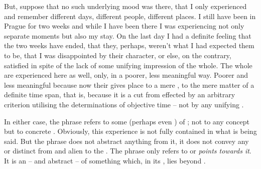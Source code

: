 But, suppose that no such underlying mood was there, that I only experienced and
remember different days, different people, different places. I still have been in
Prague for two weeks and while I have been there I was experiencing not only separate
moments but also my stay. On the last day I had a definite feeling that the two
weeks have ended, that they, perhaps, weren't what I had expected them to be,
that I was disappointed by their character, or else, on the contrary, satisfied
in spite of the lack of some unifying impression of the whole.  The whole
 are experienced here as well, only, in a poorer, less meaningful
way. {Poorer and less meaningful} because now their  gives place to a
mere , to the mere matter of a definite time span, that is, because
it is a {cut} from  effected by an arbitrary criterion
utilising the determinations of objective time -- not by any unifying
\os. 

In either case, the phrase 
refers to some  (perhaps even ) of ; not
to any concept but to  concrete .  Obviously, this
experience is not fully contained in what is being said. But the phrase does not
abstract anything from it, it does not convey any  or
distinct from and alien to the .  The phrase only refers to or
{\em points towards it}. It is an  -- and abstract --  of
something which, in its 
, lies beyond .


